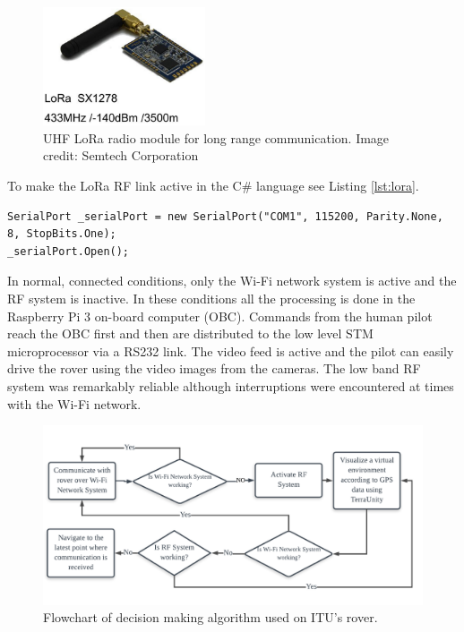 \documentclass[runningheads,a4paper]{llncs}
\begin{document}

\begin{figure}
\centering
\includegraphics[height=3.5cm]{lora}
\caption{UHF LoRa radio module for long range communication. Image credit: Semtech Corporation}
\label{fig:lora}
\end{figure}

To make the LoRa RF link active in the C\# language see Listing \ref{lst:lora}.

\begin{lstlisting}[frame=single,basicstyle=\ttfamily\footnotesize,breaklines=true,label={lst:lora},caption={Start communication with the LoRa RF module in the C\# language.}]
 SerialPort _serialPort = new SerialPort("COM1", 115200, Parity.None, 8, StopBits.One);
_serialPort.Open();
\end{lstlisting}

In normal, connected conditions, only the Wi-Fi network system is active and the RF system is inactive. In these conditions all the processing is done in the Raspberry Pi 3 on-board computer (OBC). Commands from the human pilot reach the OBC first and then are distributed to the low level STM microprocessor via a RS232 link. The video feed is active and the pilot can easily drive the rover using the video images from the cameras. The low band RF system was remarkably reliable although interruptions were encountered at times with the Wi-Fi network. 

\begin{figure}[H]
\centering
\includegraphics[width=\textwidth]{comms}
\caption{Flowchart of decision making algorithm used on ITU's rover.}
\label{fig:comms}
\end{figure}
\end{document}
